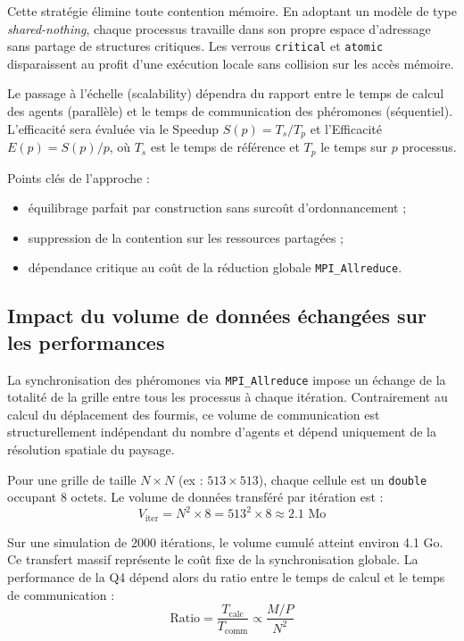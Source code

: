 \documentclass[11pt,a4paper]{article}
\begin{document}
Cette stratégie élimine toute contention mémoire. En adoptant un modèle de type \emph{shared-nothing}, chaque processus travaille dans son propre espace d'adressage sans partage de structures critiques. Les verrous \texttt{critical} et \texttt{atomic} disparaissent au profit d'une exécution locale sans collision sur les accès mémoire.

Le passage à l'échelle (scalability) dépendra du rapport entre le temps de calcul des agents (parallèle) et le temps de communication des phéromones (séquentiel). L'efficacité sera évaluée via le Speedup $S(p) = T_s / T_p$ et l'Efficacité $E(p) = S(p)/p$, où $T_s$ est le temps de référence et $T_p$ le temps sur $p$ processus.

Points clés de l'approche :
\begin{itemize}[leftmargin=1.2em]
  \item équilibrage parfait par construction sans surcoût d'ordonnancement ;
  \item suppression de la contention sur les ressources partagées ;
  \item dépendance critique au coût de la réduction globale \texttt{MPI\_Allreduce}.
\end{itemize}



\subsection{Impact du volume de données échangées sur les performances}

La synchronisation des phéromones via \texttt{MPI\_Allreduce} impose un échange de la totalité de la grille entre tous les processus à chaque itération. Contrairement au calcul du déplacement des fourmis, ce volume de communication est structurellement indépendant du nombre d'agents et dépend uniquement de la résolution spatiale du paysage.

Pour une grille de taille $N \times N$ (ex : $513 \times 513$), chaque cellule est un \texttt{double} occupant 8 octets. Le volume de données transféré par itération est :
\[
V_{\text{iter}} = N^2 \times 8 = 513^2 \times 8 \approx 2.1 \text{ Mo}
\]

Sur une simulation de 2000 itérations, le volume cumulé atteint environ 4.1 Go. Ce transfert massif représente le coût fixe de la synchronisation globale. La performance de la Q4 dépend alors du ratio entre le temps de calcul et le temps de communication :
\[
\text{Ratio} = \frac{T_{\text{calc}}}{T_{\text{comm}}} \propto \frac{M/P}{N^2}
\]
\end{document}
